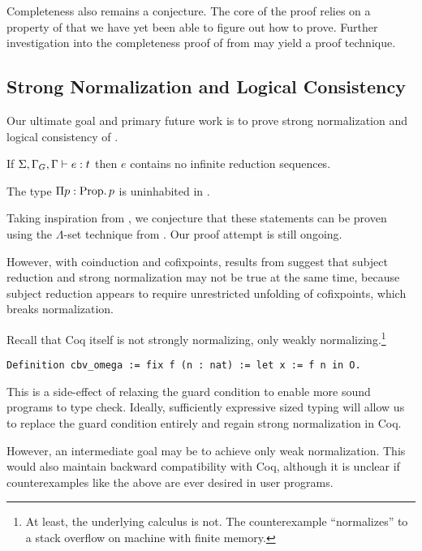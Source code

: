 Completeness also remains a conjecture.
The core of the proof relies on a property of \RecCheckLoop that we have yet been able to figure out how to prove.
Further investigation into the completeness proof of \RecCheck from \Fhat may yield a proof technique.

\subsection{Strong Normalization and Logical Consistency}

Our ultimate goal and primary future work is to prove strong normalization and logical consistency of \lang.

\begin{conjecture}\label{thm:metatheory:sn}
  If $\Sigma, \Gamma_G, \Gamma \vdash e : t$ then $e$ contains no infinite
  reduction sequences.
\end{conjecture}

\begin{conjecture}\label{thm:metatheory:lc}
  The type $\Pi p : \text{Prop} \mathpunct{.} p$ is uninhabited in \lang.
\end{conjecture}


Taking inspiration from \citet{cic-hat-minus,cc-hat-omega,cic-hat},
we conjecture that these statements can be proven using the
$\Lambda$-set technique from \citet{lambda-set-altenkrich,lambda-set-pts}.
Our proof attempt is still ongoing.

However, with coinduction and cofixpoints, results from \citet{cc-hat-omega}
suggest that subject reduction and strong
normalization may not be true at the same time, because subject
reduction appears to require unrestricted unfolding of cofixpoints,
which breaks normalization.

Recall that Coq itself is not strongly normalizing, only weakly normalizing.\footnote{At least, the underlying calculus is not. The counterexample ``normalizes'' to a stack overflow on machine with finite memory.}

\begin{verbatim}
Definition cbv_omega := fix f (n : nat) := let x := f n in O.
\end{verbatim}

This is a side-effect of relaxing the guard condition to enable more sound programs to type check.
Ideally, sufficiently expressive sized typing will allow us to replace the guard condition entirely and regain strong normalization in Coq.

However, an intermediate goal may be to achieve only weak normalization.
This would also maintain backward compatibility with Coq, although it is unclear if counterexamples like the above are ever desired in user programs.

